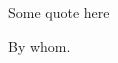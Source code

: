 \thispagestyle{empty}

\noindent
\begin{minipage}[c][\textheight][c]{\textwidth}
    \centering
    \large{Some quote here} \\
    \vspace{8mm}
    \begin{itshape}
        \large{By whom.}
    \end{itshape}
\end{minipage}

\clearpage